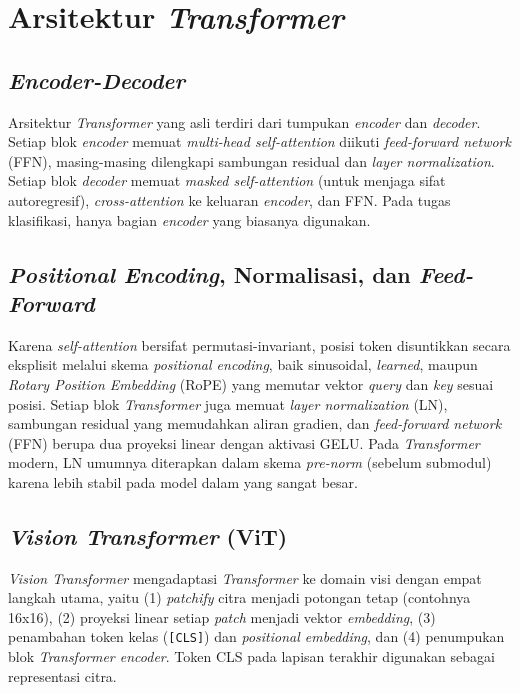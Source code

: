 \section{Arsitektur \textit{Transformer}}
\label{sec:transformer}

\subsection{\textit{Encoder-Decoder}}

Arsitektur \textit{Transformer} yang asli \citep{vaswaniAttentionAllYou2023} terdiri dari tumpukan \textit{encoder} dan \textit{decoder}. Setiap blok \textit{encoder} memuat \textit{multi-head self-attention} diikuti \textit{feed-forward network} (FFN), masing-masing dilengkapi sambungan residual dan \textit{layer normalization}. Setiap blok \textit{decoder} memuat \textit{masked self-attention} (untuk menjaga sifat autoregresif), \textit{cross-attention} ke keluaran \textit{encoder}, dan FFN. Pada tugas klasifikasi, hanya bagian \textit{encoder} yang biasanya digunakan.

\subsection{\textit{Positional Encoding}, Normalisasi, dan \textit{Feed-Forward}}

Karena \textit{self-attention} bersifat permutasi-invariant, posisi token disuntikkan secara eksplisit melalui skema \textit{positional encoding}, baik sinusoidal, \textit{learned}, maupun \textit{Rotary Position Embedding} (RoPE) \citep{suRoFormer2024} yang memutar vektor \textit{query} dan \textit{key} sesuai posisi. Setiap blok \textit{Transformer} juga memuat \textit{layer normalization} (LN), sambungan residual yang memudahkan aliran gradien, dan \textit{feed-forward network} (FFN) berupa dua proyeksi linear dengan aktivasi GELU. Pada \textit{Transformer} modern, LN umumnya diterapkan dalam skema \textit{pre-norm} (sebelum submodul) karena lebih stabil pada model dalam yang sangat besar.

\subsection{\textit{Vision Transformer} (ViT)}

\textit{Vision Transformer} \citep{dosovitskiyImageWorth16x162021} mengadaptasi \textit{Transformer} ke domain visi dengan empat langkah utama, yaitu (1) \textit{patchify} citra menjadi potongan tetap (contohnya 16x16), (2) proyeksi linear setiap \textit{patch} menjadi vektor \textit{embedding}, (3) penambahan token kelas (\texttt{[CLS]}) dan \textit{positional embedding}, dan (4) penumpukan blok \textit{Transformer encoder}. Token CLS pada lapisan terakhir digunakan sebagai representasi citra.


